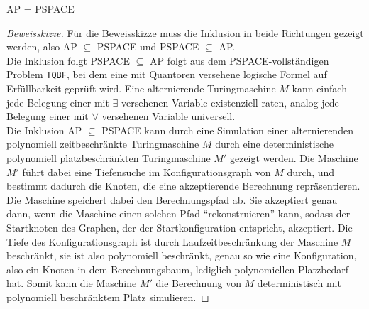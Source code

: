 \begin{theorem}
    AP = PSPACE
\end{theorem}

\begin{proof}[Beweisskizze] \cite{arora_computational_2009} \cite{sipser_introduction_2006}
    Für die Beweisskizze muss die Inklusion in beide Richtungen gezeigt werden, also AP $\subseteq$ PSPACE und PSPACE $\subseteq$ AP. \\
    Die Inklusion folgt PSPACE $\subseteq$ AP folgt aus dem PSPACE-vollständigen Problem \texttt{TQBF}, bei dem eine mit Quantoren versehene logische Formel auf Erfüllbarkeit geprüft wird.
    Eine alternierende Turingmaschine $M$ kann einfach jede Belegung einer mit $\exists$ versehenen Variable existenziell raten, analog jede Belegung einer mit $\forall$ 
    versehenen Variable universell.\\
    Die Inklusion AP $\subseteq$ PSPACE kann durch eine Simulation einer alternierenden polynomiell zeitbeschränkte Turingmaschine $M$ durch eine deterministische polynomiell platzbeschränkten Turingmaschine $M'$
    gezeigt werden. Die Maschine $M'$ führt dabei eine Tiefensuche im Konfigurationsgraph von $M$ durch, und bestimmt dadurch die Knoten, die eine akzeptierende Berechnung repräsentieren.
    Die Maschine speichert dabei den Berechnungspfad ab. Sie akzeptiert genau dann, wenn die Maschine einen solchen Pfad \enquote{rekonstruieren} kann, sodass der Startknoten des Graphen,
    der der Startkonfiguration entspricht, akzeptiert.
    Die Tiefe des Konfigurationsgraph ist durch Laufzeitbeschränkung der Maschine $M$ beschränkt, sie ist also polynomiell beschränkt, genau so wie eine Konfiguration, also ein Knoten in dem Berechnungsbaum,
    lediglich polynomiellen Platzbedarf hat. Somit kann die Maschine $M'$ die Berechnung von $M$ deterministisch mit polynomiell beschränktem Platz simulieren. 
\end{proof}